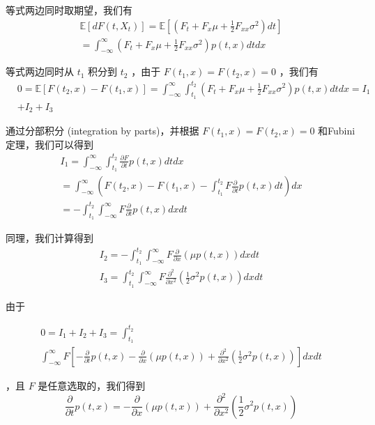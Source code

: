 等式两边同时取期望，我们有
$$
\begin{gathered}
\mathbb{E}\left[d F\left(t, X_t\right)\right]=\mathbb{E}\left[\left(F_t+F_x \mu+\frac{1}{2} F_{x x} \sigma^2\right) d t\right] \\
=\int_{-\infty}^{\infty}\left(F_t+F_x \mu+\frac{1}{2} F_{x x} \sigma^2\right) p(t, x) d t d x
\end{gathered}
$$

等式两边同时从 $t_1$ 积分到 $t_2$ ，由于 $F\left(t_1, x\right)=F\left(t_2, x\right)=0$ ，我们有
$$
\begin{aligned}
& 0=\mathbb{E}\left[F\left(t_2, x\right)-F\left(t_1, x\right)\right]=\int_{-\infty}^{\infty} 
\int_{t_1}^{t_2}\left(F_t+F_x \mu+\frac{1}{2} F_{x x} \sigma^2\right) p(t, x) d t d x=I_1 \\
& +I_2+I_3
\end{aligned}
$$

通过分部积分 (integration by parts)，并根据 $F\left(t_1, x\right)=F\left(t_2, x\right)=0$ 和Fubini定理，我们可以得到
$$
\begin{gathered}
I_1=\int_{-\infty}^{\infty} \int_{t_1}^{t_2} \frac{\partial F}{\partial t} p(t, x) d t d x \\
=\int_{-\infty}^{\infty}\left(F\left(t_2, x\right)-F\left(t_1, x\right)-\int_{t_1}^{t_2} F 
\frac{\partial}{\partial t} p(t, x) d t\right) d x \\
=-\int_{t_1}^{t_2} \int_{-\infty}^{\infty} F \frac{\partial}{\partial t} p(t, x) d x d t
\end{gathered}
$$

同理，我们计算得到
$$
\begin{gathered}
I_2=-\int_{t_1}^{t_2} \int_{-\infty}^{\infty} F \frac{\partial}{\partial x}(\mu p(t, x)) d x d t \\
I_3=\int_{t_1}^{t_2} \int_{-\infty}^{\infty} F \frac{\partial^2}{\partial x^2}\left(\frac{1}{2} \sigma^2 p(t, x)\right) d x d t
\end{gathered}
$$

由于

$$
\begin{gathered}
0=I_1+I_2+I_3=\int_{t_1}^{t_2} \\
\int_{-\infty}^{\infty} F\left[-\frac{\partial}{\partial t} p(t, x)-\frac{\partial}{\partial x} 
(\mu p(t, x))+\frac{\partial^2}{\partial x^2}\left(\frac{1}{2} \sigma^2 p(t, x)\right)\right] d x d t
\end{gathered}
$$

，且 $F$ 是任意选取的，我们得到
$$
\frac{\partial}{\partial t} p(t, x)=-\frac{\partial}{\partial x}(\mu p(t, x))+\frac{\partial^2}{\partial x^2}\left(\frac{1}{2} \sigma^2 p(t, x)\right)
$$

